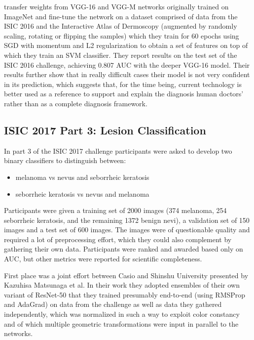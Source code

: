 \citeauthor{menegola2017} \cite{menegola2017} transfer weights from VGG-16 and VGG-M networks originally trained on ImageNet and fine-tune the network on a dataset comprised of data from the ISIC 2016 and the Interactive Atlas of Dermoscopy (augmented by randomly scaling, rotating or flipping the samples) which they train for 60 epochs using \ac{SGD} with momentum and L2 regularization to obtain a set of features on top of which they train an SVM classifier. They report results on the test set of the ISIC 2016 challenge, achieving 0.807 AUC with the deeper VGG-16 model. Their results further show that in really difficult cases their model is not very confident in its prediction, which suggests that, for the time being, current technology is better used as a reference to support and explain the diagnosis human doctors' rather than as a complete diagnosis framework.

\subsection{ISIC 2017 Part 3: Lesion Classification}

In part 3 of the ISIC 2017 \cite{isic2017} challenge participants were asked to develop two binary classifiers to distinguish between:

\begin{itemize}
    \item melanoma vs nevus and seborrheic keratosis
    \item seborrheic keratosis vs nevus and melanoma
\end{itemize}

Participants were given a training set of 2000 images (374 melanoma, 254 seborrheic keratosis, and the remaining 1372 benign nevi), a validation set of 150 images and a test set of 600 images. The images were of questionable quality and required a lot of preprocessing effort, which they could also complement by gathering their own data. Participants were ranked and awarded based only on AUC, but other metrics were reported for scientific completeness.

First place was a joint effort between Casio and Shinshu University presented by Kazuhisa Matsunaga et al\cite{isic2017first}. In their work they adopted ensembles of their own variant of ResNet-50 that they trained presumably end-to-end (using RMSProp\cite{rmsprop} and AdaGrad\cite{adagrad}) on data from the challenge as well as data they gathered independently, which was normalized in such a way to exploit color constancy and of which multiple geometric transformations were input in parallel to the networks.

